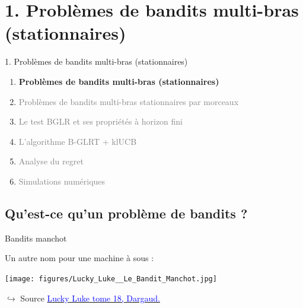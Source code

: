 \documentclass[11pt,french,ignorenonframetext,]{beamer}
\begin{document}
\section{\hfill{}1. Problèmes de bandits multi-bras (stationnaires)\hfill{}}

\begin{frame}{1. Problèmes de bandits multi-bras (stationnaires)}

  \begin{enumerate}
    \item
    \alert{\textbf{%
      Problèmes de bandits multi-bras (stationnaires)
    }}
    \vspace*{15pt}

    \item
    \textcolor{gray}{
      Problèmes de bandits multi-bras stationnaires par morceaux
    }
    \vspace*{15pt}

    \item
    \textcolor{gray}{
      Le test BGLR et ses propriétés à horizon fini
    }
    \vspace*{15pt}

    \item
    \textcolor{gray}{
      L'algorithme B-GLRT + klUCB
    }
    \vspace*{15pt}

    \item
    \textcolor{gray}{
      Analyse du regret
    }
    \vspace*{15pt}

    \item
    \textcolor{gray}{
      Simulations numériques
    }
  \end{enumerate}

\end{frame}

\subsection{\hfill{}Qu'est-ce qu'un problème de bandits ?\hfill{}}


\begin{frame}{Bandits manchot}

  Un autre nom pour une machine à sous :

  \begin{center}
    \texttt{[image: figures/Lucky\_Luke\_\_Le\_Bandit\_Manchot.jpg]}
  \end{center}

  \begin{tiny}
  $\hookrightarrow$ Source
    \href{https://www.dargaud.com/bd/LUCKY-LUKE/Lucky-Luke/Lucky-Luke-tome-18-Bandit-manchot-Le}{\textcolor{blue}{Lucky Luke tome 18, \textcopyright{} Dargaud.}}
  \end{tiny}

\end{frame}
\end{document}
